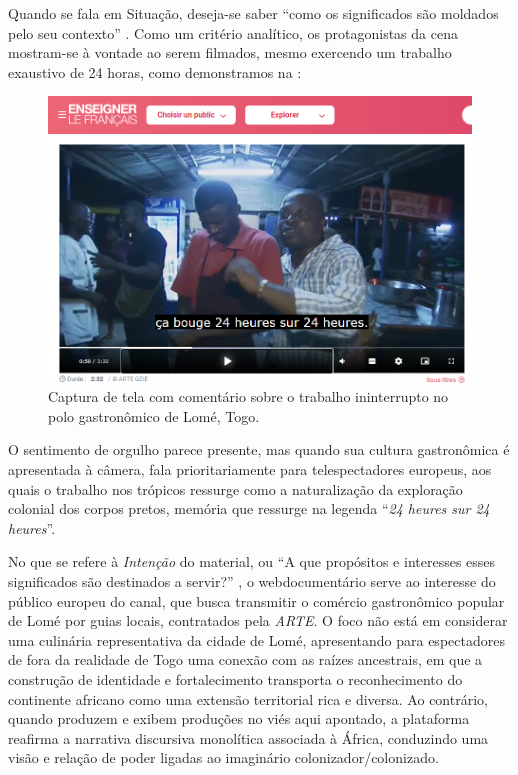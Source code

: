 \documentclass[portuguese]{textolivre}
\begin{document}
Quando se fala em Situação, deseja-se saber “como os significados são moldados pelo seu contexto” \cite[p. 293]{kalantzis_letramentos_2020}. Como um critério analítico, os protagonistas da cena mostram-se à vontade ao serem filmados, mesmo exercendo um trabalho exaustivo de 24 horas, como demonstramos na :

\begin{figure}
    \centering
    \begin{minipage}{.75\textwidth}
    \includegraphics[width=\linewidth]{Fig8.png}
    \caption{Captura de tela com comentário sobre o trabalho ininterrupto no polo gastronômico de Lomé, Togo.}
    \label{fig8}
    \end{minipage}
\end{figure}

O sentimento de orgulho parece presente, mas quando sua cultura gastronômica é apresentada à câmera, fala prioritariamente para telespectadores europeus, aos quais o trabalho nos trópicos ressurge como a naturalização da exploração colonial dos corpos pretos, memória que ressurge na legenda “\textit{24 heures sur 24 heures}”. 

No que se refere à \emph{Intenção} do material, ou “A que propósitos e interesses esses significados são destinados a servir?” \cite[p. 293]{kalantzis_letramentos_2020}, o webdocumentário serve ao interesse do público europeu do canal, que busca transmitir o comércio gastronômico popular de Lomé por guias locais, contratados pela \textit{ARTE}. O foco não está em considerar uma culinária representativa da cidade de Lomé, apresentando para espectadores de fora da realidade de Togo uma conexão com as raízes ancestrais, em que a construção de identidade e fortalecimento transporta o reconhecimento do continente africano como uma extensão territorial rica e diversa. Ao contrário, quando produzem e exibem produções no viés aqui apontado, a plataforma reafirma a narrativa discursiva monolítica associada à África, conduzindo uma visão e relação de poder ligadas ao imaginário colonizador/colonizado.
\end{document}
